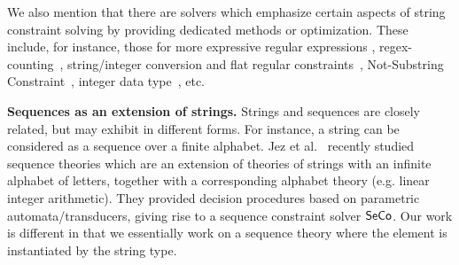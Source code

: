 
We also mention that there are solvers which emphasize certain aspects of string constraint solving by providing dedicated methods or optimization. These include, for instance, those for more expressive regular expressions \cite{BerzishDGKMMN23,ChenFHHHKLRW22},  regex-counting~\cite{HuW23},  %
string/integer conversion and flat regular constraints~\cite{WuCWXZ24}, Not-Substring Constraint~\cite{AbdullaACDHHTWY21}, integer data type~\cite{atva2020}, etc. 


\smallskip
\noindent
{\bf Sequences as an extension of strings.} Strings and sequences are closely related, but may exhibit in different forms. For instance, a string can be considered as a sequence over a finite alphabet. 
Jez et al.~\cite{JezLMR23} recently studied sequence theories which are an extension of theories of strings with an infinite alphabet of letters, together with a corresponding alphabet theory (e.g. linear integer arithmetic). They provided decision procedures based on parametric automata/transducers, giving rise to a sequence constraint solver ${\sf SeCo}$. Our work is different in that we essentially work on a sequence theory where the element is instantiated by the string type. 

%

